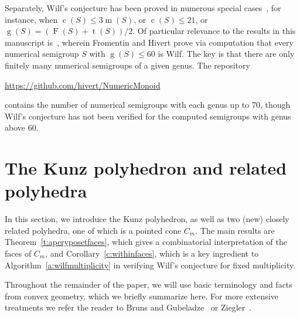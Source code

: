 \documentclass[12pt]{amsart}
\theoremstyle{definition}
\numberwithin{equation}{section}
\renewcommand\>{\rangle}
\newcommand\<{\langle}
\newcommand\0{\mathbf{0}}
\begin{document}
Separately, Wilf's conjecture has been proved in numerous special cases~\cite{barucci,d-m,eliahou-mc,e-ma}, for instance, when $\operatorname c(S) \le 3\operatorname m(S)$, or $\operatorname c(S) \le 21$, or $\operatorname g(S) = (\operatorname F(S) + \operatorname t(S))/2$.  Of particular relevance to the results in this manuscript is~\cite{f-h}, wherein Fromentin and Hivert prove via computation that every numerical semigroup $S$ with $\operatorname g(S) \le 60$ is Wilf.  The key is that there are only finitely many numerical semigroups of a given genus.  The repository
\begin{center}
\url{https://github.com/hivert/NumericMonoid}
\end{center}
contains the number of numerical semigroups with each genus up to 70, though Wilf's conjecture has not been verified for the computed semigroups with genus above 60.


   
\section{The Kunz polyhedron and related polyhedra}%
\label{sec:kunz}%

In this section, we introduce the Kunz polyhedron, as well as two (new) closely related polyhedra, one of which is a pointed cone $C_m$.  The main results are Theorem~\ref{t:aperyposetfaces}, which gives a combinatorial interpretation of the faces of $C_m$, and Corollary~\ref{c:withinfaces}, which is a key ingredient to Algorithm~\ref{a:wilfmultiplicity} in verifying Wilf's conjecture for fixed multiplicity.  

Throughout the remainder of the paper, we will use basic terminology and facts from convex geometry, which we briefly summarize here. For more extensive treatments we refer the reader to Bruns and Gubeladze~\cite{BG} or Ziegler~\cite{Ziegler}.
\end{document}
